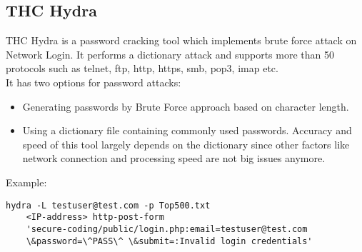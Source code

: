 \subsection{THC Hydra}
THC Hydra is a password cracking tool which implements brute force attack on Network Login. It performs a dictionary attack and supports more than 50 protocols such as telnet, ftp, http, https, smb, pop3, imap etc. \\
It has two options for password attacks:
\begin{itemize}
    \item Generating passwords by Brute Force approach based on character length.
    \item Using a dictionary file containing commonly used passwords. Accuracy and speed of this tool largely depends on the dictionary since other factors like network connection and processing speed are not big issues anymore.
\end{itemize}
Example:

\begin{lstlisting}
hydra -L testuser@test.com -p Top500.txt
    <IP-address> http-post-form
    'secure-coding/public/login.php:email=testuser@test.com
    \&password=\^PASS\^ \&submit=:Invalid login credentials'
\end{lstlisting}